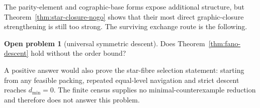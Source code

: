 \documentclass[11pt]{article}
\theoremstyle{definition}
\newtheorem{problem}[theorem]{Open problem}
\theoremstyle{remark}
\newcommand{\1}{\mathbf 1}
\begin{document}
The parity-element and cographic-base forms expose additional structure,
but Theorem~\ref{thm:star-closure-nogo} shows that their most direct
graphic-closure strengthening is still too strong.  The surviving
exchange route is the following.

\begin{problem}[universal symmetric descent]\label{prob:descent}
Does Theorem~\ref{thm:fano-descent} hold without the order bound?
\end{problem}

A positive answer would also prove the star-fibre selection statement:
starting from any feasible packing, repeated equal-level navigation and
strict descent reaches \(d_{\min}=0\).  The finite census supplies no
minimal-counterexample reduction and therefore does not answer this
problem.
\end{document}
